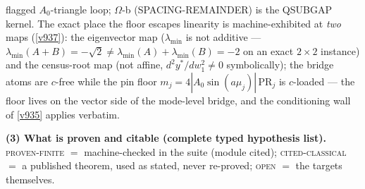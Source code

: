 \begin{itemize}
  flagged $A_0$-triangle loop; $\Omega$-b (SPACING-REMAINDER) is the QSUBGAP kernel.  The
  exact place the floor escapes linearity is machine-exhibited at \emph{two} maps
  (\vref{v937}): the eigenvector map ($\lambda_{\min}$ is not additive ---
  $\lambda_{\min}(A{+}B) = -\sqrt2 \ne \lambda_{\min}(A) + \lambda_{\min}(B) = -2$ on an exact
  $2\times2$ instance) and the census-root map (not affine, $d^2y^*/dw_1^2 \ne 0$
  symbolically); the bridge atoms are $c$-free while the pin floor $m_j =
  4|A_0\sin(a\mu_j)|\,\mathrm{PR}_j$ is $c$-loaded --- the floor lives on the vector side of
  the mode-level bridge, and the conditioning wall of \vref{v935} applies verbatim.
\end{itemize}


\par\smallskip\noindent\textbf{(3) What is proven and citable (complete typed hypothesis
list).}  \textsc{proven-finite} $=$ machine-checked in the suite (module cited);
\textsc{cited-classical} $=$ a published theorem, used as stated, never re-proved;
\textsc{open} $=$ the targets themselves.
